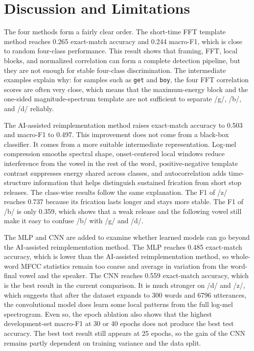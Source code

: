 \section{Discussion and Limitations}

The four methods form a fairly clear order. The short-time FFT template method reaches 0.265 exact-match accuracy and 0.244 macro-F1, which is close to random four-class performance. This result shows that framing, FFT, local blocks, and normalized correlation can form a complete detection pipeline, but they are not enough for stable four-class discrimination. The intermediate examples explain why: for samples such as \texttt{get} and \texttt{boy}, the four FFT correlation scores are often very close, which means that the maximum-energy block and the one-sided magnitude-spectrum template are not sufficient to separate /g/, /b/, and /d/ reliably.

The AI-assisted reimplementation method raises exact-match accuracy to 0.503 and macro-F1 to 0.497. This improvement does not come from a black-box classifier. It comes from a more suitable intermediate representation. Log-mel compression smooths spectral shape, onset-centered local windows reduce interference from the vowel in the rest of the word, positive-negative template contrast suppresses energy shared across classes, and autocorrelation adds time-structure information that helps distinguish sustained frication from short stop releases. The class-wise results follow the same explanation. The F1 of /z/ reaches 0.737 because its frication lasts longer and stays more stable. The F1 of /b/ is only 0.359, which shows that a weak release and the following vowel still make it easy to confuse /b/ with /g/ and /d/.

The MLP and CNN are added to examine whether learned models can go beyond the AI-assisted reimplementation method. The MLP reaches 0.485 exact-match accuracy, which is lower than the AI-assisted reimplementation method, so whole-word MFCC statistics remain too coarse and average in variation from the word-final vowel and the speaker. The CNN reaches 0.559 exact-match accuracy, which is the best result in the current comparison. It is much stronger on /d/ and /z/, which suggests that after the dataset expands to 300 words and 6796 utterances, the convolutional model does learn some local patterns from the full log-mel spectrogram. Even so, the epoch ablation also shows that the highest development-set macro-F1 at 30 or 40 epochs does not produce the best test accuracy. The best test result still appears at 25 epochs, so the gain of the CNN remains partly dependent on training variance and the data split.

